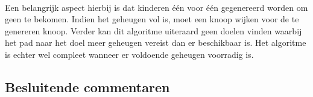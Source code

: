 \paragraph{}Een belangrijk aspect hierbij is dat kinderen \'e\'en voor \'e\'en gegenereerd worden om geen  te bekomen. Indien het geheugen vol is, moet een knoop wijken voor de te genereren knoop. Verder kan dit algoritme uiteraard geen doelen vinden waarbij het pad naar het doel meer geheugen vereist dan er beschikbaar is. Het algoritme is echter wel compleet wanneer er voldoende geheugen voorradig is.%
\subsection{Besluitende commentaren}
